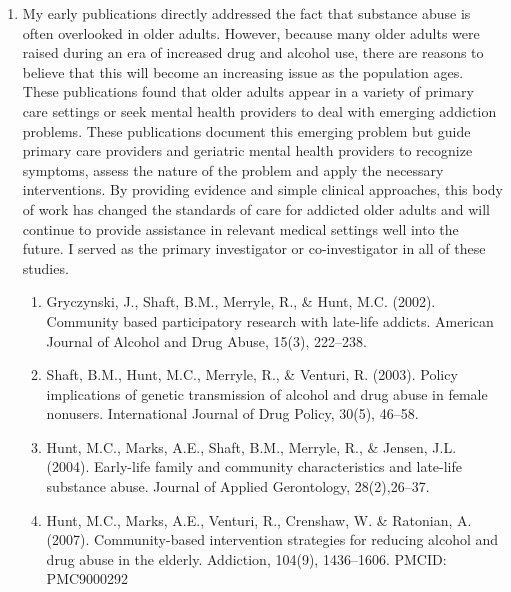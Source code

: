 \documentclass{nihbiosketch}
\begin{document}
\begin{enumerate}

\item My early publications directly addressed the fact that substance abuse is
    often overlooked in older adults. However, because many older adults were
    raised during an era of increased drug and alcohol use, there are reasons
    to believe that this will become an increasing issue as the population
    ages.   These publications found that older adults appear in a variety of
    primary care settings or seek mental health providers to deal with emerging
    addiction problems.  These publications document this emerging problem but
    guide primary care providers and geriatric mental health providers to
    recognize symptoms, assess the nature of the problem and apply the
    necessary interventions.   By providing evidence and simple clinical
    approaches, this body of work has changed the standards of care for
    addicted older adults and will continue to provide assistance in relevant
    medical settings well into the future.  I served as the primary
    investigator or co-investigator in all of these studies. 

\begin{enumerate}

\item Gryczynski, J., Shaft, B.M., Merryle, R., \& Hunt, M.C. (2002). Community
        based participatory research with late-life addicts. American Journal
        of Alcohol and Drug Abuse, 15(3), 222--238.

\item Shaft, B.M., Hunt, M.C., Merryle, R., \& Venturi, R. (2003). Policy
        implications of genetic transmission of alcohol and drug abuse in
        female nonusers. International Journal of Drug Policy, 30(5), 46--58.

\item Hunt, M.C., Marks, A.E., Shaft, B.M., Merryle, R., \& Jensen, J.L.
        (2004). Early-life family and community characteristics and late-life
        substance abuse. Journal of Applied Gerontology, 28(2),26--37.

\item Hunt, M.C., Marks, A.E., Venturi, R., Crenshaw, W. \& Ratonian, A.
        (2007). Community-based intervention strategies for reducing alcohol
        and drug abuse in the elderly.  Addiction, 104(9), 1436--1606. PMCID:
        PMC9000292

\end{enumerate}



\end{enumerate}
\end{document}
